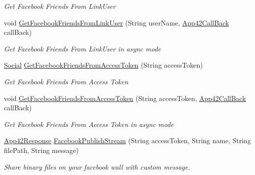 \begin{DoxyCompactItemize}
\begin{DoxyCompactList}\small\item\em Get Facebook Friends From Link\+User \end{DoxyCompactList}\item 
void \hyperlink{classcom_1_1shephertz_1_1app42_1_1paas_1_1sdk_1_1csharp_1_1social_1_1_social_service_a8a9c7c1724d19bf8bf084fab5870d6a5}{Get\+Facebook\+Friends\+From\+Link\+User} (String user\+Name, \hyperlink{interfacecom_1_1shephertz_1_1app42_1_1paas_1_1sdk_1_1csharp_1_1_app42_call_back}{App42\+Call\+Back} call\+Back)
\begin{DoxyCompactList}\small\item\em Get Facebook Friends From Link\+User in async mode \end{DoxyCompactList}\item 
\hyperlink{classcom_1_1shephertz_1_1app42_1_1paas_1_1sdk_1_1csharp_1_1social_1_1_social}{Social} \hyperlink{classcom_1_1shephertz_1_1app42_1_1paas_1_1sdk_1_1csharp_1_1social_1_1_social_service_a6b2728a038efa5d45d6442187d5e7193}{Get\+Facebook\+Friends\+From\+Access\+Token} (String access\+Token)
\begin{DoxyCompactList}\small\item\em Get Facebook Friends From Access Token \end{DoxyCompactList}\item 
void \hyperlink{classcom_1_1shephertz_1_1app42_1_1paas_1_1sdk_1_1csharp_1_1social_1_1_social_service_ab13a7dcb22a44496ed4596f27e07eee2}{Get\+Facebook\+Friends\+From\+Access\+Token} (String access\+Token, \hyperlink{interfacecom_1_1shephertz_1_1app42_1_1paas_1_1sdk_1_1csharp_1_1_app42_call_back}{App42\+Call\+Back} call\+Back)
\begin{DoxyCompactList}\small\item\em Get Facebook Friends From Access Token in async mode \end{DoxyCompactList}\item 
\hyperlink{classcom_1_1shephertz_1_1app42_1_1paas_1_1sdk_1_1csharp_1_1_app42_response}{App42\+Response} \hyperlink{classcom_1_1shephertz_1_1app42_1_1paas_1_1sdk_1_1csharp_1_1social_1_1_social_service_a7dec3231f8e274bcd3f1738f27faea0f}{Facebook\+Publish\+Stream} (String access\+Token, String name, String file\+Path, String message)
\begin{DoxyCompactList}\small\item\em Share binary files on your facebook wall with custom message. \end{DoxyCompactList}\item 

\end{DoxyCompactItemize}
